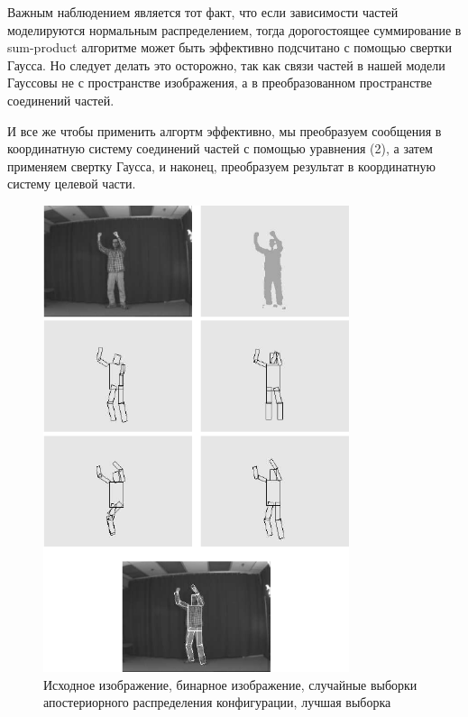 Важным наблюдением является тот факт, что если зависимости частей моделируются нормальным распределением, тогда дорогостоящее суммирование в sum-product алгоритме может быть эффективно подсчитано с помощью свертки Гаусса. Но следует делать это осторожно, так как связи частей в нашей модели Гауссовы не с пространстве изображения, а в преобразованном пространстве соединений частей.

И все же чтобы применить алгортм эффективно, мы преобразуем сообщения в координатную систему соединений частей с помощью уравнения (2), а затем применяем свертку Гаусса, и наконец, преобразуем результат в координатную систему целевой части.

\begin{figure}
  \centering
  \includegraphics[width=0.8\textwidth]{images/detection-stages.png}
  \caption{Исходное изображение, бинарное изображение, случайные выборки апостериорного распределения конфигурации, лучшая выборка\label{detection-stages}}
\end{figure}

